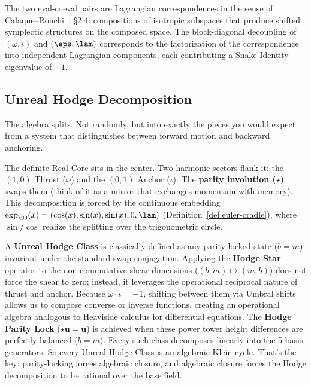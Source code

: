 \begin{remark}
The two eval-coeval pairs are Lagrangian correspondences in the sense of Calaque--Ronchi~\cite{calaque-ronchi}, \S2.4: compositions of isotropic subspaces that produce shifted symplectic structures on the composed space. The block-diagonal decoupling of $(\omega, \iota)$ and $(\eps, \lam)$ corresponds to the factorization of the correspondence into independent Lagrangian components, each contributing a Snake Identity eigenvalue of $-1$.
\end{remark}

\subsection{Unreal Hodge Decomposition}

The algebra splits. Not randomly, but into exactly the pieces you would expect from a system that distinguishes between forward motion and backward anchoring.

The definite Real Core sits in the center. Two harmonic sectors flank it: the $(1,0)$ Thrust ($\omega$) and the $(0,1)$ Anchor ($\iota$). The \textbf{parity involution ($\star$)} swaps them (think of it as a mirror that exchanges momentum with memory). This decomposition is forced by the continuous embedding $\exp_{\UU}(x) = (\cos(x), \sin(x), \sin(x), 0, \lam)$ (Definition~\ref{def:euler-cradle}), where $\sin/\cos$ realize the splitting over the trigonometric circle.

A \textbf{Unreal Hodge Class} is classically defined as any parity-locked state ($b = m$) invariant under the standard swap conjugation. Applying the \textbf{Hodge Star} operator to the non-commutative shear dimensions ($(b, m) \mapsto (m, b)$) does not force the shear to zero; instead, it leverages the operational reciprocal nature of thrust and anchor. Because $\omega \cdot \iota = -1$, shifting between them via Umbral shifts allows us to compose converse or inverse functions, creating an operational algebra analogous to Heaviside calculus for differential equations. The \textbf{Hodge Parity Lock} ($\star \mathbf{u} = \mathbf{u}$) is achieved when these power tower height differences are perfectly balanced ($b = m$). Every such class decomposes linearly into the 5 basis generators. So every Unreal Hodge Class is an algebraic Klein cycle. That's the key: parity-locking forces algebraic closure, and algebraic closure forces the Hodge decomposition to be rational over the base field.

